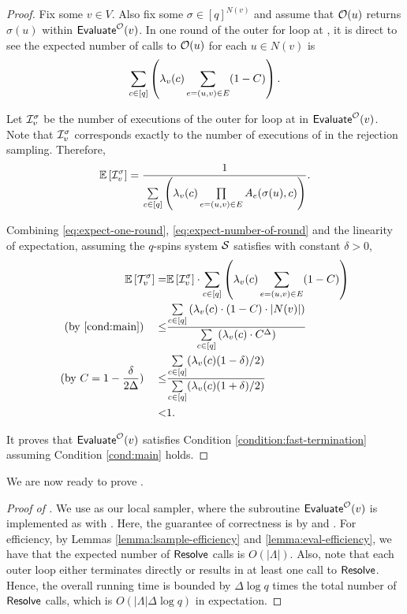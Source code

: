 \begin{proof}
Fix some $v\in V$. Also fix some $\sigma\in [q]^{N(v)}$ and assume that $\mathcal{O}(u)$ returns $\sigma(u)$ within $\textnormal{\textsf{Evaluate}}^{\mathcal{O}}(v)$. In one round of the outer for loop at , it is direct to see the expected number of calls to $\mathcal{O}(u)$ for each $u\in N(v)$ is
\begin{align}
 \sum\limits_{c\in[q]}\left(\lambda_v(c) \sum_{e=(u,v)\in E} (1-C)\right).\label{eq:expect-one-round}
\end{align}


 Let $\mathcal{I}^{\sigma}_v$ be the number of executions of the outer for loop at  in $\textnormal{\textsf{Evaluate}}^{\mathcal{O}}(v)$. Note that $\mathcal{I}^{\sigma}_v$ corresponds exactly to the number of executions of  in the rejection sampling. Therefore,
\begin{align}
\mathbb{E}\left[{\mathcal{I}^{\sigma}_v}\right] = \frac{1}{\sum\limits_{c\in[q]}\left(\lambda_v(c)\prod\limits_{e=(u,v)\in E}A_e(\sigma(u),c)\right)}.
\label{eq:expect-number-of-round}
\end{align}

Combining \eqref{eq:expect-one-round}, \eqref{eq:expect-number-of-round} and the linearity of expectation, assuming the $q$-spins system $\mathcal{S}$ satisfies  with constant $\delta>0$,
\begin{align*}
\E{\+{T}^{\sigma}_v} =& \E{\+{I}^{\sigma}_v}\cdot \sum\limits_{c\in[q]}\left(\lambda_v(c) \sum\limits_{e=(u,v)\in E} (1-\lb)\right) \\
 \text{(by \Cref{cond:main})}\quad \leq &\frac{\sum\limits_{c\in [q]}\left(\lambda_v(c)\cdot (1-\lb)\cdot |N(v)| \right)}{\sum\limits_{c\in[q]}\left(\lambda_v(c)\cdot C^{\Delta}\right)} \\
 \text{(by $\lb=1-\frac{\delta}{2\Delta}$)}\quad        \leq &\frac{\sum\limits_{c\in [q]}(\lambda_v(c)(1-\delta)/2)}{\sum\limits_{c\in [q]}(\lambda_v(c)(1+\delta)/2)} \\
         < &1.
\end{align*}

It proves that $\textnormal{\textsf{Evaluate}}^{\mathcal{O}}(v)$ satisfies Condition \ref{condition:fast-termination} assuming Condition \ref{cond:main} holds.
\end{proof}

We are now ready to prove .

\begin{proof}[Proof of ]
    We use  as our local sampler, where the subroutine $\textnormal{\textsf{Evaluate}}^{\mathcal{O}}(v)$ is implemented as  with . Here, the guarantee of correctness is by  and .
    For efficiency, by Lemmas \ref{lemma:lsample-efficiency} and \ref{lemma:eval-efficiency}, we have that the expected number of $\textnormal{\textsf{Resolve}}$  calls is $O(|\Lambda|)$. Also, note that each outer loop either terminates directly or results in at least one call to $\textnormal{\textsf{Resolve}}$. Hence, the overall running time is bounded by $\Delta \log q$ times the total number of $\textnormal{\textsf{Resolve}}$  calls, which is $O(|\Lambda|\Delta\log q)$ in expectation.
\end{proof}


